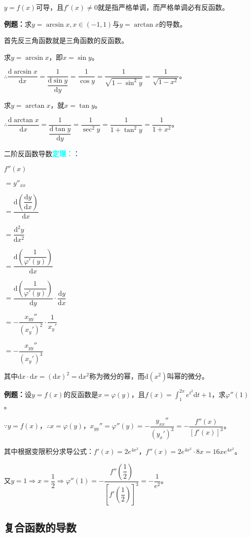 \documentclass[UTF8, 12pt]{ctexart}
\begin{document}
$y=f(x)$可导，且$f'(x)\neq 0$就是指严格单调，而严格单调必有反函数。

\textbf{例题：}求$y=\arcsin x,x\in(-1,1)$与$y=\arctan x$的导数。

首先反三角函数就是三角函数的反函数。

求$y=\arcsin x$，即$x=\sin y$。\medskip

$\therefore\dfrac{\textrm{d}\arcsin x}{\textrm{d}x}=\dfrac{1}{\dfrac{\textrm{d}\sin y}{\textrm{d}y}}=\dfrac{1}{\cos y}=\dfrac{1}{\sqrt{1-\sin^2y}}=\dfrac{1}{\sqrt{1-x^2}}$。\medskip

求$y=\arctan x$，就$x=\tan y$。\medskip

$\therefore\dfrac{\textrm{d}\arctan x}{\textrm{d}x}=\dfrac{1}{\dfrac{\textrm{d}\tan y}{\textrm{d}y}}=\dfrac{1}{\sec^2y}=\dfrac{1}{1+\tan^2y}=\dfrac{1}{1+x^2}$。\medskip

二阶反函数导数\textcolor{aqua}{\textbf{定理：}}：

$f''(x)$

$=y''_{xx}$\medskip

$=\dfrac{\textrm{d}\left(\dfrac{\textrm{d}y}{\textrm{d}x}\right)}{\textrm{d}x}$\medskip

$=\dfrac{\textrm{d}^2y}{\textrm{d}x^2}$\medskip

$=\dfrac{\textrm{d}\left(\dfrac{1}{\varphi'(y)}\right)}{\textrm{d}x}$\medskip

$=\dfrac{\textrm{d}\left(\dfrac{1}{\varphi'(y)}\right)}{\textrm{d}y}\cdot\dfrac{\textrm{d}y}{\textrm{d}x}$\medskip

$=-\dfrac{x_{yy}''}{(x_y')^2}\cdot\dfrac{1}{x_y'}$\medskip

$=-\dfrac{x_{yy}''}{(x_y')^3}$\medskip

其中$\textrm{d}x\cdot\textrm{d}x=(\textrm{d}x)^2=\textrm{d}x^2$称为微分的幂，而$\textrm{d}(x^2)$叫幂的微分。

\textbf{例题：}设$y=f(x)$的反函数是$x=\varphi(y)$，且$f(x)=\int_1^{2x}e^{t^2}\textrm{d}t+1$，求$\varphi''(1)$。

$\because y=f(x)$，$\therefore x=\varphi(y)$，$x_{yy}''=\varphi''(y)=-\dfrac{y_{xx}''}{(y_x')^3}=-\dfrac{f''(x)}{[f'(x)]^3}$。\medskip

其中根据变限积分求导公式：$f'(x)=2e^{4x^2}$，$f''(x)=2e^{4x^2}\cdot 8x=16xe^{4x^2}$。\medskip

又$y=1\Rightarrow x=\dfrac{1}{2}\Rightarrow\varphi''(1)=-\dfrac{f''\left(\dfrac{1}{2}\right)}{\left[f'\left(\dfrac{1}{2}\right)\right]^3}=-\dfrac{1}{e^2}$。

\subsection{复合函数的导数}
\end{document}
